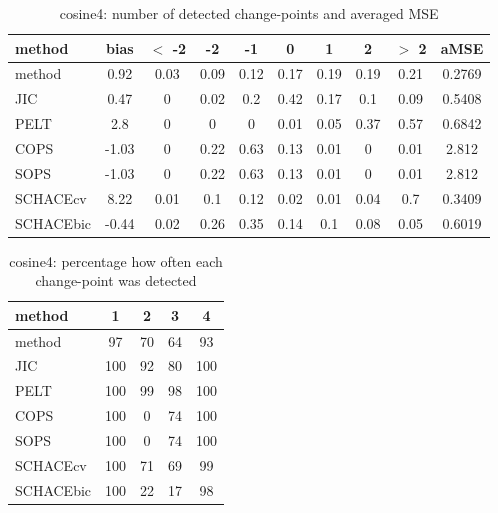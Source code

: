 \begin{table}[ht]
\centering
\begin{tabular}{l|c|ccccccc|c}
  \hline
method & bias & $<$ -2 & -2 & -1 & 0 & 1 & 2 & $>$ 2 & aMSE \\ 
  \hline
method &  0.92 &  0.03 &  0.09 &  0.12 &  0.17 &  0.19 &  0.19 &  0.21 & 0.2769 \\ 
  JIC &  0.47 &     0 &  0.02 &   0.2 &  0.42 &  0.17 &   0.1 &  0.09 & 0.5408 \\ 
  PELT &   2.8 &     0 &     0 &     0 &  0.01 &  0.05 &  0.37 &  0.57 & 0.6842 \\ 
  COPS & -1.03 &     0 &  0.22 &  0.63 &  0.13 &  0.01 &     0 &  0.01 & 2.812 \\ 
  SOPS & -1.03 &     0 &  0.22 &  0.63 &  0.13 &  0.01 &     0 &  0.01 & 2.812 \\ 
  SCHACEcv &  8.22 &  0.01 &   0.1 &  0.12 &  0.02 &  0.01 &  0.04 &   0.7 & 0.3409 \\ 
  SCHACEbic & -0.44 &  0.02 &  0.26 &  0.35 &  0.14 &   0.1 &  0.08 &  0.05 & 0.6019 \\ 
   \hline
\end{tabular}
\caption{cosine4: number of detected change-points and averaged MSE} 
\label{tab:cosine4Njumps}
\end{table}
\begin{table}[ht]
\centering
\begin{tabular}{l|cccc}
  \hline
method & 1 & 2 & 3 & 4 \\ 
  \hline
method &     97 &     70 &     64 &     93 \\ 
  JIC &    100 &     92 &     80 &    100 \\ 
  PELT &    100 &     99 &     98 &    100 \\ 
  COPS &    100 &      0 &     74 &    100 \\ 
  SOPS &    100 &      0 &     74 &    100 \\ 
  SCHACEcv &    100 &     71 &     69 &     99 \\ 
  SCHACEbic &    100 &     22 &     17 &     98 \\ 
   \hline
\end{tabular}
\caption{cosine4: percentage how often each change-point was detected} 
\label{tab:cosine4Detections}
\end{table}
